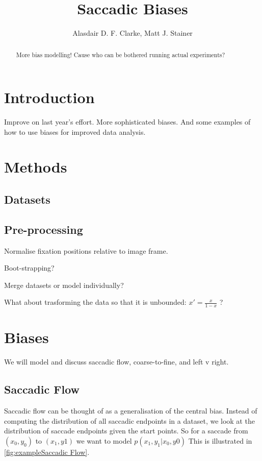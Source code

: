\documentclass[a4paper, onecolumn, oneside, 11pt]{article}
\title{Saccadic Biases}
\author{Alasdair D. F. Clarke, Matt J. Stainer}
\begin{document}
\maketitle

\begin{abstract}
More bias modelling! Cause who can be bothered running actual experiments?
\end{abstract}


\section{Introduction}

Improve on last year's \citep{clarke-tatler2014} effort. More sophisticated biases. And some examples of how to use biases for improved data analysis. 

\section{Methods}

\subsection{Datasets}

\subsection{Pre-processing}

Normalise fixation positions relative to image frame. 

Boot-strapping? 

Merge datasets or model individually? 

What about trasforming the data so that it is unbounded: $x'=\frac{x}{1-x}$   ? 

\section{Biases}

We will model and discuss saccadic flow, coarse-to-fine, and left v right. 

\subsection{Saccadic Flow}

Saccadic flow can be thought of as a generalisation of the central bias. Instead of computing the distribution of all saccadic endpoints in a dataset, we look at the distribution of saccade endpoints given the start points. So for a saccade from $(x_0, y_0)$ to $(x_1, y1)$ we want to model $p(x_1,y_1|x_0, y0)$ This is illustrated in \ref{fig:exampleSaccadic Flow}.
\end{document}

